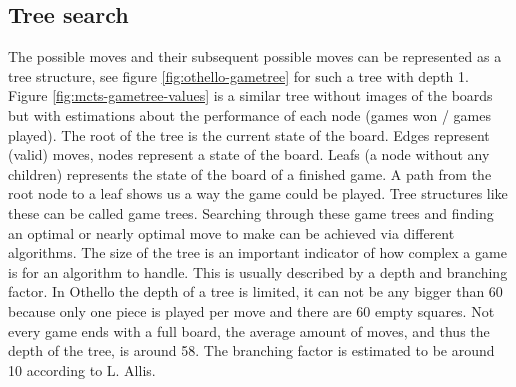 \documentclass[
11pt, %
english, %
singlespacing, %
headsepline, %
]{MastersDoctoralThesis} %
\begin{document}
\subsection{Tree search}
The possible moves and their subsequent possible moves can be represented as a tree structure, see figure \ref{fig:othello-gametree} for such a tree with depth 1. Figure \ref{fig:mcts-gametree-values} is a similar tree without images of the boards but with estimations about the performance of each node (games won / games played). The root of the tree is the current state of the board. Edges represent (valid) moves, nodes represent a state of the board. Leafs (a node without any children) represents the state of the board of a finished game. A path from the root node to a leaf shows us a way the game could be played. Tree structures like these can be called game trees. Searching through these game trees and finding an optimal or nearly optimal move to make can be achieved via different algorithms. The size of the tree is an important indicator of how complex a game is for an algorithm to handle. This is usually described by a depth and branching factor. In Othello the depth of a tree is limited, it can not be any bigger than 60 because only one piece is played per move and there are 60 empty squares. Not every game ends with a full board, the average amount of moves, and thus the depth of the tree, is around 58. The branching factor is estimated to be around 10 according to L. Allis\cite{Allis:1994}.
\end{document}
